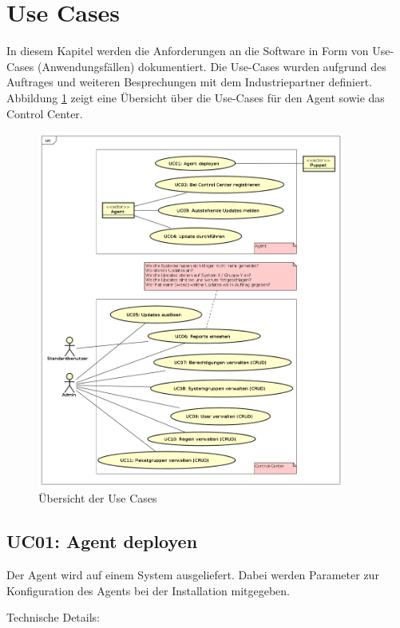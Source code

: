 \section{Use Cases}

In diesem Kapitel werden die Anforderungen an die Software in Form von Use-Cases (Anwendungsfällen) dokumentiert. Die Use-Cases wurden aufgrund des Auftrages und weiteren Besprechungen mit dem Industriepartner definiert. Abbildung \ref{fig:usecases} zeigt eine Übersicht über die Use-Cases für den Agent sowie das Control Center.

\begin{figure}
  \centering
    \includegraphics[width=0.9\textwidth]{files/UseCases}
  \caption{Übersicht der Use Cases}
  \label{fig:usecases}
\end{figure}


\subsection*{UC01: Agent deployen}
\label{sec:uc_01}

Der Agent wird auf einem System ausgeliefert. Dabei werden Parameter zur Konfiguration des Agents bei der Installation mitgegeben.


Technische Details:

